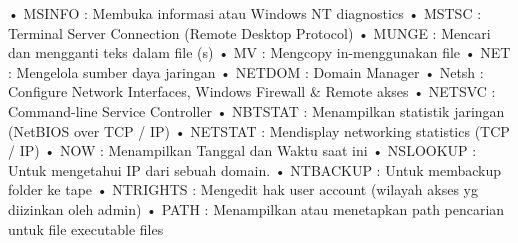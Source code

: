 \documentclass{article}
\begin{document}
• MSINFO : Membuka informasi atau Windows NT diagnostics
• MSTSC : Terminal Server Connection (Remote Desktop Protocol)
• MUNGE : Mencari dan mengganti teks dalam file (s)
• MV : Mengcopy in-menggunakan file
• NET : Mengelola sumber daya jaringan
• NETDOM : Domain Manager
• Netsh : Configure Network Interfaces, Windows Firewall & Remote akses
• NETSVC : Command-line Service Controller
• NBTSTAT : Menampilkan statistik jaringan (NetBIOS over TCP / IP)
• NETSTAT : Mendisplay networking statistics (TCP / IP)
• NOW : Menampilkan  Tanggal dan Waktu saat ini
• NSLOOKUP : Untuk mengetahui IP dari sebuah domain.
• NTBACKUP : Untuk membackup  folder ke tape
• NTRIGHTS : Mengedit hak user account (wilayah akses yg diizinkan oleh admin)
• PATH : Menampilkan atau menetapkan path pencarian untuk file executable files
\end{document}
